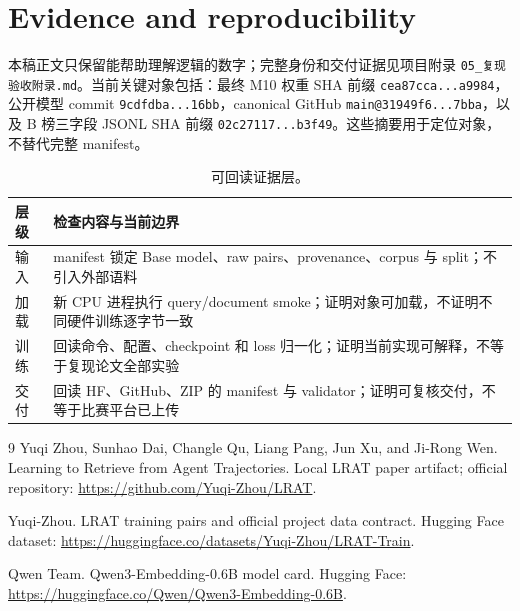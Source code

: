 \documentclass[UTF8,10pt,a4paper,twocolumn]{ctexart}
\begin{document}
\appendix
\section{Evidence and reproducibility}

本稿正文只保留能帮助理解逻辑的数字；完整身份和交付证据见项目附录 \texttt{05\_复现验收附录.md}。当前关键对象包括：最终 M10 权重 SHA 前缀 \texttt{cea87cca...a9984}，公开模型 commit \texttt{9cdfdba...16bb}，canonical GitHub \texttt{main@31949f6...7bba}，以及 B 榜三字段 JSONL SHA 前缀 \texttt{02c27117...b3f49}。这些摘要用于定位对象，不替代完整 manifest。

\begin{table}[t]
\centering
\caption{可回读证据层。}
\label{tab:evidence}
\scriptsize
\begin{tabular}{p{1.25cm}p{6.0cm}}
\toprule
层级 & 检查内容与当前边界\\
\midrule
输入 & manifest 锁定 Base model、raw pairs、provenance、corpus 与 split；不引入外部语料\\
加载 & 新 CPU 进程执行 query/document smoke；证明对象可加载，不证明不同硬件训练逐字节一致\\
训练 & 回读命令、配置、checkpoint 和 loss 归一化；证明当前实现可解释，不等于复现论文全部实验\\
交付 & 回读 HF、GitHub、ZIP 的 manifest 与 validator；证明可复核交付，不等于比赛平台已上传\\
\bottomrule
\end{tabular}
\end{table}

\begin{thebibliography}{9}
Yuqi Zhou, Sunhao Dai, Changle Qu, Liang Pang, Jun Xu, and Ji-Rong Wen.
\newblock Learning to Retrieve from Agent Trajectories.
\newblock Local LRAT paper artifact; official repository:
\url{https://github.com/Yuqi-Zhou/LRAT}.

Yuqi-Zhou.
\newblock LRAT training pairs and official project data contract.
\newblock Hugging Face dataset:
\url{https://huggingface.co/datasets/Yuqi-Zhou/LRAT-Train}.

Qwen Team.
\newblock Qwen3-Embedding-0.6B model card.
\newblock Hugging Face:
\url{https://huggingface.co/Qwen/Qwen3-Embedding-0.6B}.
\end{thebibliography}
\end{document}
